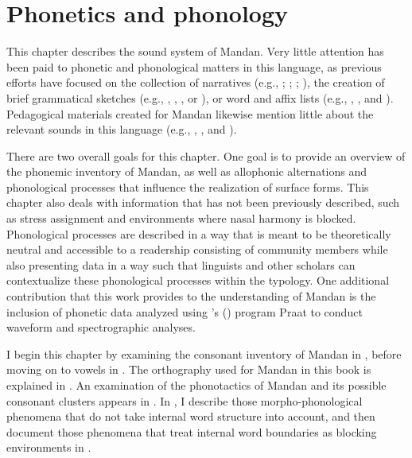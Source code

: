 \chapter{Phonetics and phonology}\label{chapter2}

This chapter describes the sound system of Mandan. Very little attention has been paid to phonetic and phonological matters in this language, as previous efforts have focused on the collection of narratives  (e.g., \citealt{kennard1934}; \citealt{hollow1973a,hollow1973b}; \citealt{trechteretal2009}; \citealt{trechter2012,trechter2012b}), the creation of brief grammatical sketches (e.g., \citealt{kennard1936}, \citealt{coberly1979}, \citealt{carter1991b}, or \citealt{mixco1997a}), or word and affix lists (e.g., \citealt{maximilian1839}, \citealt{will1906}, and \citealt{hollow1970}). Pedagogical materials created for Mandan likewise mention little about the relevant sounds in this language (e.g., \citealt{hollow1976}, \citealt{littleowl1992}, and \citealt{benson2000}).

There are two overall goals for this chapter. One goal is to provide an overview of the phonemic inventory of Mandan, as well as allophonic alternations and phonological processes that influence the realization of surface forms. This chapter also deals with information that has not been previously described, such as stress assignment and environments where nasal harmony is blocked. Phonological processes are described in a way that is meant to be theoretically neutral and accessible to a readership consisting of community members while also presenting data in a way such that linguists and other scholars can contextualize these phonological processes within the typology. One additional contribution that this work provides to the understanding of Mandan is the inclusion of phonetic data analyzed using \citeauthor{boersmaweenik2016}'s (\citeyear{boersmaweenik2016}) program Praat to conduct waveform and spectrographic analyses.

I begin this chapter by examining the consonant inventory of Mandan in , before moving on to vowels in . The orthography used for Mandan in this book is explained in . An examination of the phonotactics of Mandan and its possible consonant clusters appears in . In , I describe those morpho-phonological phenomena that do not take internal word structure into account, and then document those phenomena that treat internal word boundaries as blocking environments in .


